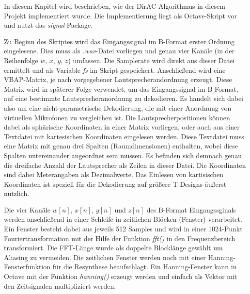 In diesem Kapitel wird beschrieben, wie der DirAC-Algorithmus in diesem Projekt implementiert wurde. Die Implementierung liegt als Octave-Skript vor und nutzt das \textit{signal}-Package.

Zu Beginn des Skriptes wird das Eingangssignal im B-Format erster Ordnung eingelesene. Dies muss als \textit{.wav}-Datei vorliegen und genau vier Kanäle (in der Reihenfolge $w$, $x$, $y$, $z$) umfassen. Die Samplerate wird direkt aus dieser Datei ermittelt und als Variable \textit{fs} im Skript gespeichert. Anschließend wird eine VBAP-Matrix, je nach vorgegebener Lautsprecherandordnung erzeugt. Diese Matrix wird in späterer Folge verwendet, um das Eingangssignal im B-Format, auf eine bestimmte Lautsprecheranordnung zu dekodieren. Es handelt sich dabei also um eine nicht-parametrische Dekodierung, die mit einer Anordnung von virtuellen Mikrofonen zu vergleichen ist. Die Lautsprecherpositionen können dabei als sphärische Koordinaten in einer Matrix vorliegen, oder auch aus einer Textdatei mit kartesischen Koordinaten eingelesen werden. Diese Textdatei muss eine Matrix mit genau drei Spalten (Raumdimensionen) enthalten, wobei diese Spalten untereinander angeordnet sein müssen. Es befinden sich demnach genau die dreifache Anzahl der Lautsprecher als Zeilen in dieser Datei. Die Koordinaten sind dabei Meterangaben als Dezimalwerte. Das Einlesen von kartisischen Koordinaten ist speziell für die Dekodierung auf größere T-Designs äußerst nützlich.

Die vier Kanäle $w[n]$, $x[n]$, $y[n]$ und $z[n]$ des B-Format Eingangssginals werden anschließend in einer Schleife in zeitlichen Blöcken (Fenster) verarbeitet. Ein Fenster besteht dabei aus jeweils 512 Samples und wird in einer 1024-Punkt Fouriertransformation mit der Hilfe der Funktion \textit{fft()} in den Frequenzbereich transformiert. Die FFT-Länge wurde als doppelte Blocklänge gewählt um Aliasing zu vermeiden. Die zeitlichen Fenster werden noch mit einer Hanning-Fensterfunktion für die Resynthese beaufschlagt. Ein Hanning-Fenster kann in Octave mit der Funktion \textit{hanning()} erzeugt werden und einfach als Vektor mit den Zeitsignalen multipliziert werden.